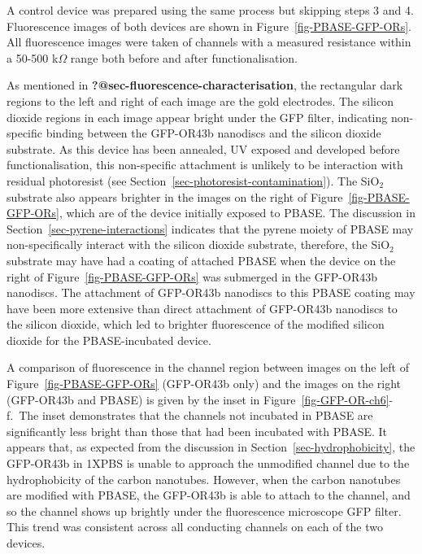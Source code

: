 \documentclass[
  a4paper,
]{scrbook}
\begin{document}
A control device was prepared using the same process but skipping steps
3 and 4. Fluorescence images of both devices are shown in
Figure~\ref{fig-PBASE-GFP-ORs}. All fluorescence images were taken of
channels with a measured resistance within a 50-500 k\(\Omega\) range
both before and after functionalisation.

As mentioned in \textbf{?@sec-fluorescence-characterisation}, the
rectangular dark regions to the left and right of each image are the
gold electrodes. The silicon dioxide regions in each image appear bright
under the GFP filter, indicating non-specific binding between the
GFP-OR43b nanodiscs and the silicon dioxide substrate. As this device
has been annealed, UV exposed and developed before functionalisation,
this non-specific attachment is unlikely to be interaction with residual
photoresist (see Section~\ref{sec-photoresist-contamination}). The
SiO\(_2\) substrate also appears brighter in the images on the right of
Figure~\ref{fig-PBASE-GFP-ORs}, which are of the device initially
exposed to PBASE. The discussion in
Section~\ref{sec-pyrene-interactions} indicates that the pyrene moiety
of PBASE may non-specifically interact with the silicon dioxide
substrate, therefore, the SiO\(_2\) substrate may have had a coating of
attached PBASE when the device on the right of
Figure~\ref{fig-PBASE-GFP-ORs} was submerged in the GFP-OR43b nanodiscs.
The attachment of GFP-OR43b nanodiscs to this PBASE coating may have
been more extensive than direct attachment of GFP-OR43b nanodiscs to the
silicon dioxide, which led to brighter fluorescence of the modified
silicon dioxide for the PBASE-incubated device.

A comparison of fluorescence in the channel region between images on the
left of Figure~\ref{fig-PBASE-GFP-ORs} (GFP-OR43b only) and the images
on the right (GFP-OR43b and PBASE) is given by the inset in
Figure~\ref{fig-GFP-OR-ch6}-f.~The inset demonstrates that the channels
not incubated in PBASE are significantly less bright than those that had
been incubated with PBASE. It appears that, as expected from the
discussion in Section~\ref{sec-hydrophobicity}, the GFP-OR43b in 1XPBS
is unable to approach the unmodified channel due to the hydrophobicity
of the carbon nanotubes. However, when the carbon nanotubes are modified
with PBASE, the GFP-OR43b is able to attach to the channel, and so the
channel shows up brightly under the fluorescence microscope GFP filter.
This trend was consistent across all conducting channels on each of the
two devices.
\end{document}
